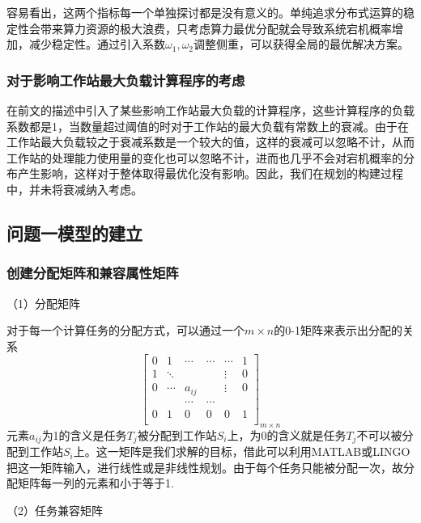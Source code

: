 \documentclass{MathorCupmodeling}
\begin{document}
容易看出，这两个指标每一个单独探讨都是没有意义的。单纯追求分布式运算的稳定性会带来算力资源的极大浪费，只考虑算力最优分配就会导致系统宕机概率增加，减少稳定性。通过引入系数$\omega_1,\omega_2$调整侧重，可以获得全局的最优解决方案。

\subsubsection{对于影响工作站最大负载计算程序的考虑}

在前文的描述中引入了某些影响工作站最大负载的计算程序，这些计算程序的负载系数都是1，当数量超过阈值的时对于工作站的最大负载有常数上的衰减。由于在工作站最大负载较之于衰减系数是一个较大的值，这样的衰减可以忽略不计，从而工作站的处理能力使用量的变化也可以忽略不计，进而也几乎不会对宕机概率的分布产生影响，这样对于整体取得最优化没有影响。因此，我们在规划的构建过程中，并未将衰减纳入考虑。

\subsection{问题一模型的建立}

\subsubsection{创建分配矩阵和兼容属性矩阵}

​（1）分配矩阵

对于每一个计算任务的分配方式，可以通过一个$m\times n$的0-1矩阵来表示出分配的关系
\begin{equation}
{\begin{bmatrix}0&1&\cdots&\cdots&\cdots&1\\1&\ddots&&&\vdots&0\\0&\cdots&a_{ij}&&\vdots&0\\&&\cdots&\cdots&&\\0&1&0&0&0&1\\\end{bmatrix}}_{m\times n}
\end{equation}
元素$a_{ij}$为1的含义是任务$T_j$被分配到工作站$S_i$上，为0的含义就是任务$T_j$不可以被分配到工作站$S_i$上。这一矩阵是我们求解的目标，借此可以利用MATLAB或LINGO把这一矩阵输入，进行线性或是非线性规划。由于每个任务只能被分配一次，故分配矩阵每一列的元素和小于等于1.

（2）任务兼容矩阵
\end{document}
